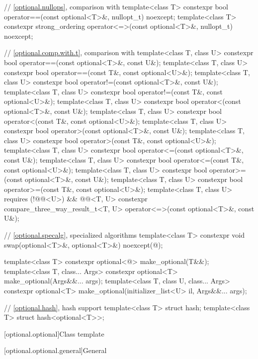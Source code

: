 \begin{codeblock}
{  // \ref{optional.nullops}, comparison with 
  template<class T> constexpr bool operator==(const optional<T>&, nullopt_t) noexcept;
  template<class T>
    constexpr strong_ordering operator<=>(const optional<T>&, nullopt_t) noexcept;

  // \ref{optional.comp.with.t}, comparison with 
  template<class T, class U> constexpr bool operator==(const optional<T>&, const U&);
  template<class T, class U> constexpr bool operator==(const T&, const optional<U>&);
  template<class T, class U> constexpr bool operator!=(const optional<T>&, const U&);
  template<class T, class U> constexpr bool operator!=(const T&, const optional<U>&);
  template<class T, class U> constexpr bool operator<(const optional<T>&, const U&);
  template<class T, class U> constexpr bool operator<(const T&, const optional<U>&);
  template<class T, class U> constexpr bool operator>(const optional<T>&, const U&);
  template<class T, class U> constexpr bool operator>(const T&, const optional<U>&);
  template<class T, class U> constexpr bool operator<=(const optional<T>&, const U&);
  template<class T, class U> constexpr bool operator<=(const T&, const optional<U>&);
  template<class T, class U> constexpr bool operator>=(const optional<T>&, const U&);
  template<class T, class U> constexpr bool operator>=(const T&, const optional<U>&);
  template<class T, class U>
      requires (!@@<U>) && @@<T, U>
    constexpr compare_three_way_result_t<T, U>
      operator<=>(const optional<T>&, const U&);

  // \ref{optional.specalg}, specialized algorithms
  template<class T>
    constexpr void swap(optional<T>&, optional<T>&) noexcept(@\seebelow@);

  template<class T>
    constexpr optional<@\seebelow@> make_optional(T&&);
  template<class T, class... Args>
    constexpr optional<T> make_optional(Args&&... args);
  template<class T, class U, class... Args>
    constexpr optional<T> make_optional(initializer_list<U> il, Args&&... args);

  // \ref{optional.hash}, hash support
  template<class T> struct hash;
  template<class T> struct hash<optional<T>>;
}
\end{codeblock}

[optional.optional]{Class template  }

[optional.optional.general]{General}

